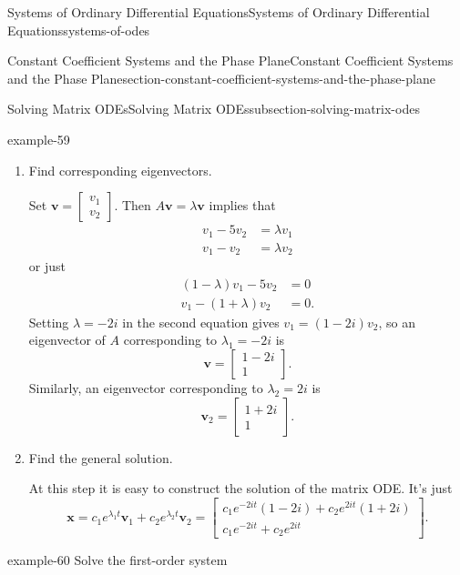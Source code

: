 \documentclass[oneside,10pt,]{book}
\numberwithin{equation}{section}
\renewcommand{\vec}[1]{\mathbf{#1}}
\newcommand{\amp}{&}
\begin{document}
\begin{chapterptx}{Systems of Ordinary Differential Equations}{}{Systems of Ordinary Differential Equations}{}{}{systems-of-odes}
\begin{sectionptx}{Constant Coefficient Systems and the Phase Plane}{}{Constant Coefficient Systems and the Phase Plane}{}{}{section-constant-coefficient-systems-and-the-phase-plane}
\begin{subsectionptx}{Solving Matrix ODEs}{}{Solving Matrix ODEs}{}{}{subsection-solving-matrix-odes}
\begin{example}{}{example-59}
\begin{enumerate}
\item\hypertarget{li-21}{}\hypertarget{p-351}{}%
Find corresponding eigenvectors.%
\par
\hypertarget{p-352}{}%
Set \(\vec{v} = \begin{bmatrix}v_{1} \\ v_{2}\end{bmatrix}\). Then \(A\vec{v} = \lambda\vec{v}\) implies that%
\begin{align*}
v_{1} - 5v_{2}  \amp =  \lambda v_{1}\\
v_{1} -v_{2}  \amp =  \lambda v_{2}
\end{align*}
or just%
\begin{align*}
(1-\lambda)v_{1} - 5v_{2} \amp =0\\
v_{1} - (1+\lambda)v_{2} \amp = 0.
\end{align*}
Setting \(\lambda=-2i\) in the second equation gives \(v_{1} = (1-2i)v_{2}\), so an eigenvector of \(A\) corresponding to \(\lambda_{1} = -2i\) is%
\begin{equation*}
\vec{v} = \begin{bmatrix}1-2i \\ 1\end{bmatrix}.
\end{equation*}
Similarly, an eigenvector corresponding to \(\lambda_{2}=2i\) is%
\begin{equation*}
\vec{v}_{2} = \begin{bmatrix}1+2i\\1\end{bmatrix}.
\end{equation*}
%
\item\hypertarget{li-22}{}\hypertarget{p-353}{}%
Find the general solution.%
\par
\hypertarget{p-354}{}%
At this step it is easy to construct the solution of the matrix ODE. It's just%
\begin{equation*}
\vec{x} = c_{1}e^{\lambda_{1}t}\vec{v}_{1} + c_{2}e^{\lambda_{2}t}\vec{v}_{2} = \begin{bmatrix}c_{1}e^{-2it}(1-2i)+c_{2}e^{2it}(1+2i) \\ c_{1}e^{-2it}+c_{2}e^{2it}\end{bmatrix}.
\end{equation*}
%
\end{enumerate}
%
\end{example}
\begin{example}{}{example-60}%
\hypertarget{p-355}{}%
Solve the first-order system%
\begin{align*}

\end{align*}
\end{example}
\end{subsectionptx}
\end{sectionptx}
\end{chapterptx}
\end{document}
